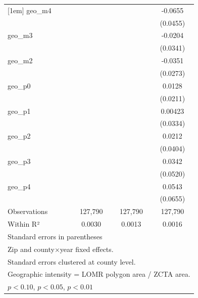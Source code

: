 \begin{table}[htbp]
\begin{tabular}{l*{3}{c}}
[1em]
geo\_m4              &                     &                     &     -0.0655         \\
                    &                     &                     &    (0.0455)         \\
[1em]
geo\_m3              &                     &                     &     -0.0204         \\
                    &                     &                     &    (0.0341)         \\
[1em]
geo\_m2              &                     &                     &     -0.0351         \\
                    &                     &                     &    (0.0273)         \\
[1em]
geo\_p0              &                     &                     &      0.0128         \\
                    &                     &                     &    (0.0211)         \\
[1em]
geo\_p1              &                     &                     &     0.00423         \\
                    &                     &                     &    (0.0334)         \\
[1em]
geo\_p2              &                     &                     &      0.0212         \\
                    &                     &                     &    (0.0404)         \\
[1em]
geo\_p3              &                     &                     &      0.0342         \\
                    &                     &                     &    (0.0520)         \\
[1em]
geo\_p4              &                     &                     &      0.0543         \\
                    &                     &                     &    (0.0655)         \\
\hline
Observations        &     127,790         &     127,790         &     127,790         \\
Within R²           &      0.0030         &      0.0013         &      0.0016         \\
\hline\hline
\multicolumn{4}{l}{\footnotesize Standard errors in parentheses}\\
\multicolumn{4}{l}{\footnotesize Zip and county×year fixed effects.}\\
\multicolumn{4}{l}{\footnotesize Standard errors clustered at county level.}\\
\multicolumn{4}{l}{\footnotesize Geographic intensity = LOMR polygon area / ZCTA area.}\\
\multicolumn{4}{l}{\footnotesize \sym{*} \(p<0.10\), \sym{**} \(p<0.05\), \sym{***} \(p<0.01\)}\\
\end{tabular}
\end{table}
